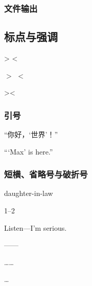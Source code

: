 \documentclass{ctexart}
\begin{document}
        \subsubsection{文件输出}

    \subsection{标点与强调}
            > < 
            
            $>$ $<$ 
            
            \textgreater \textless 
        
            \subsubsection{引号}
            “你好，‘世界’！” 
            
            ``\thinspace`Max' is here.'' 
    
        \subsubsection{短横、省略号与破折号}
            daughter-in-law

            1--2
            
            Listen---I'm serious.
        
            ——
            
            ……
            
            \ldots
            
\end{document}
